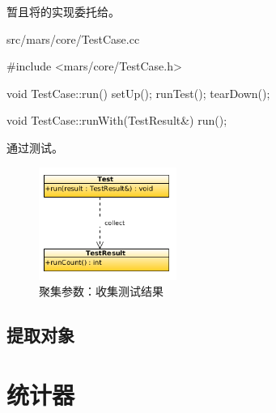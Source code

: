 \begin{content}
暂且将的实现委托给。

\begin{nodiff}{src/mars/core/TestCase.cc}
 \begin{c++}
#include <mars/core/TestCase.h>

void TestCase::run() {
  setUp();
  runTest();
  tearDown();
}

void TestCase::runWith(TestResult&) {
  run();
}
 \end{c++}
\end{nodiff}

通过测试。

\begin{figure}[H]
\centering
\includegraphics[width=0.4\textwidth]{figures/xunit/test-result.png}
\caption{聚集参数：收集测试结果}
 \label{fig:test-tree}
\end{figure}

\subsection{提取对象}

\end{content}

\section{统计器}

